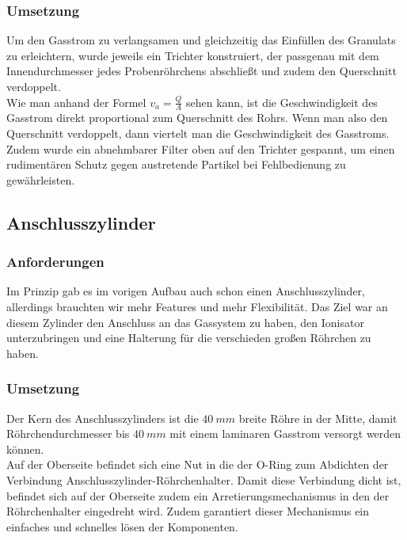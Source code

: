 \subsubsection{Umsetzung}

Um den Gasstrom zu verlangsamen und gleichzeitig das Einfüllen des Granulats zu erleichtern, wurde jeweils ein Trichter konstruiert, der passgenau mit dem Innendurchmesser jedes Probenröhrchens abschließt und zudem den Querschnitt verdoppelt. \\
Wie man anhand der Formel $v_a = \frac{Q}{A}$ \cite{Grollius2012} sehen kann, ist die Geschwindigkeit des Gasstrom direkt proportional zum Querschnitt des Rohrs. Wenn man also den Querschnitt verdoppelt, dann viertelt man die Geschwindigkeit des Gasstroms. \\
Zudem wurde ein abnehmbarer Filter oben auf den Trichter gespannt, um einen rudimentären Schutz gegen austretende Partikel bei Fehlbedienung zu gewährleisten.


\subsection{Anschlusszylinder}

\subsubsection{Anforderungen}

Im Prinzip gab es im vorigen Aufbau auch schon einen Anschlusszylinder, allerdings brauchten wir mehr Features und mehr Flexibilität. Das Ziel war an diesem Zylinder den Anschluss an das Gassystem zu haben, den Ionisator unterzubringen und eine Halterung für die verschieden großen Röhrchen zu haben.


\subsubsection{Umsetzung}

Der Kern des Anschlusszylinders ist die $\SI{40}{mm}$ breite Röhre in der Mitte, damit Röhrchendurchmesser bis $\SI{40}{mm}$ mit einem laminaren Gasstrom versorgt werden können. \\
Auf der Oberseite befindet sich eine Nut in die der O-Ring zum Abdichten der Verbindung Anschlusszylinder-Röhrchenhalter. Damit diese Verbindung dicht ist, befindet sich auf der Oberseite zudem ein Arretierungsmechanismus in den der Röhrchenhalter eingedreht wird. Zudem garantiert dieser Mechanismus ein einfaches und schnelles lösen der Komponenten.


